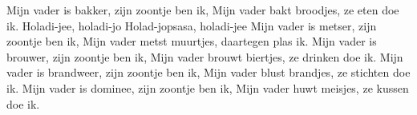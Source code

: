 \beginverse
Mijn vader is bakker, zijn zoontje ben ik,
Mijn vader bakt broodjes, ze eten doe ik.
\endverse
\beginchorus
Holadi-jee, holadi-jo
Holad-jopsasa, holadi-jee 
\endchorus
\beginverse
Mijn vader is metser, zijn zoontje ben ik,
Mijn vader metst muurtjes, daartegen plas ik.
\endverse
\beginverse
Mijn vader is brouwer, zijn zoontje ben ik,
Mijn vader brouwt biertjes, ze drinken doe ik. 
\endverse
\beginverse
Mijn vader is brandweer, zijn zoontje ben ik, 
Mijn vader blust brandjes, ze stichten doe ik.
\endverse
\beginverse
Mijn vader is dominee, zijn zoontje ben ik,
Mijn vader huwt meisjes, ze kussen doe ik. 
\endverse
\endsong